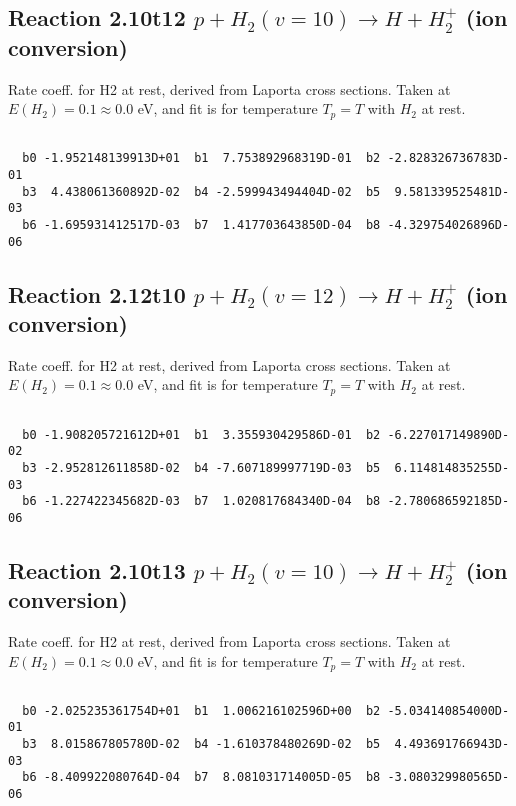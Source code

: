 \newpage
\subsection{
Reaction 2.10t12
$ p + H_2(v=10) \rightarrow H + H_2^+$ (ion conversion)
}
Rate coeff. for H2 at rest, derived from Laporta cross sections.
Taken at $E(H_2) = 0.1 \approx 0.0$ eV,  and fit is for temperature $T_p=T$ with $H_2$ at rest.

\begin{small}\begin{verbatim}

  b0 -1.952148139913D+01  b1  7.753892968319D-01  b2 -2.828326736783D-01
  b3  4.438061360892D-02  b4 -2.599943494404D-02  b5  9.581339525481D-03
  b6 -1.695931412517D-03  b7  1.417703643850D-04  b8 -4.329754026896D-06

\end{verbatim}\end{small}

\newpage
\subsection{
Reaction 2.12t10
$ p + H_2(v=12) \rightarrow H + H_2^+$ (ion conversion)
}
Rate coeff. for H2 at rest, derived from Laporta cross sections.
Taken at $E(H_2) = 0.1 \approx 0.0$ eV,  and fit is for temperature $T_p=T$ with $H_2$ at rest.

\begin{small}\begin{verbatim}

  b0 -1.908205721612D+01  b1  3.355930429586D-01  b2 -6.227017149890D-02
  b3 -2.952812611858D-02  b4 -7.607189997719D-03  b5  6.114814835255D-03
  b6 -1.227422345682D-03  b7  1.020817684340D-04  b8 -2.780686592185D-06

\end{verbatim}\end{small}

\newpage
\subsection{
Reaction 2.10t13
$ p + H_2(v=10) \rightarrow H + H_2^+$ (ion conversion)
}
Rate coeff. for H2 at rest, derived from Laporta cross sections.
Taken at $E(H_2) = 0.1 \approx 0.0$ eV,  and fit is for temperature $T_p=T$ with $H_2$ at rest.

\begin{small}\begin{verbatim}

  b0 -2.025235361754D+01  b1  1.006216102596D+00  b2 -5.034140854000D-01
  b3  8.015867805780D-02  b4 -1.610378480269D-02  b5  4.493691766943D-03
  b6 -8.409922080764D-04  b7  8.081031714005D-05  b8 -3.080329980565D-06

\end{verbatim}\end{small}

